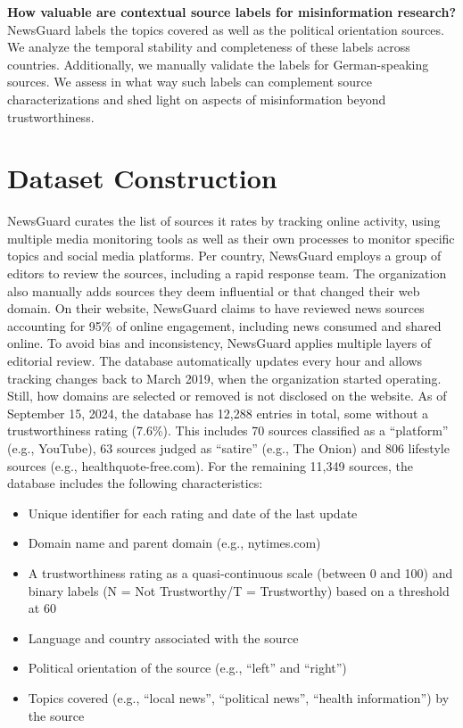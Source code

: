 \documentclass[12pt,twoside]{article}
\begin{document}
\textbf{How valuable are contextual source labels for misinformation research?} 
NewsGuard labels the topics covered as well as the political orientation sources. 
We analyze the temporal stability and completeness of these labels across countries. 
Additionally, we manually validate the labels for German-speaking sources.
We assess in what way such labels can complement source characterizations and shed light on aspects of misinformation beyond trustworthiness.

\section{Dataset Construction}
NewsGuard curates the list of sources it rates by tracking online activity, using multiple media monitoring tools as well as their own processes to monitor specific topics and social media platforms.
Per country, NewsGuard employs a group of editors to review the sources, including a rapid response team. 
The organization also manually adds sources they deem influential or that changed their web domain. 
On their website, NewsGuard claims to have reviewed news sources accounting for 95\% of online engagement, including news consumed and shared online. 
To avoid bias and inconsistency, NewsGuard applies multiple layers of editorial review.
The database automatically updates every hour and allows tracking changes back to March 2019, when the organization started operating. 
Still, how domains are selected or removed is not disclosed on the website.
As of September 15, 2024, the database has 12,288 entries in total, some without a trustworthiness rating (7.6\%). 
This includes 70 sources classified as a ``platform'' (e.g., YouTube), 63 sources judged as ``satire'' (e.g., The Onion) and 806 lifestyle sources (e.g., healthquote-free.com).
For the remaining 11,349 sources, the database includes the following characteristics:
\begin{itemize}
    \item Unique identifier for each rating and date of the last update
    \item Domain name and parent domain (e.g., nytimes.com)
    \item A trustworthiness rating as a quasi-continuous scale (between 0 and 100) and binary labels (N = Not Trustworthy/T = Trustworthy) based on a threshold at 60
    \item Language and country associated with the source
    \item Political orientation of the source (e.g., ``left'' and ``right'')
    \item Topics covered (e.g., ``local news'', ``political news'', ``health information'') by the source
\end{itemize}
\end{document}
